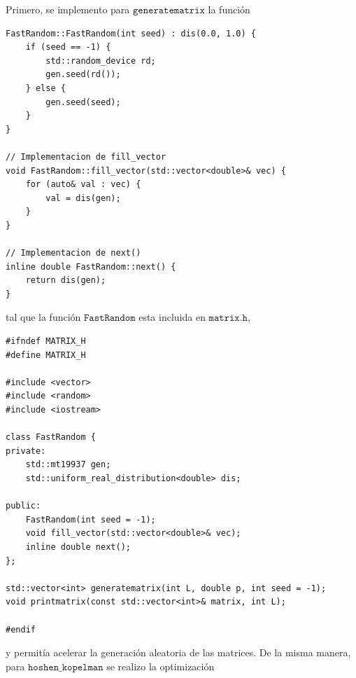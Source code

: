 \documentclass[12pt,a4paper]{article}
\begin{document}
Primero, se implemento para $\texttt{generatematrix}$ la función 
\\

\begin{lstlisting}[style=cpp-style]
FastRandom::FastRandom(int seed) : dis(0.0, 1.0) {
    if (seed == -1) {
        std::random_device rd;
        gen.seed(rd());
    } else {
        gen.seed(seed);
    }
}

// Implementacion de fill_vector
void FastRandom::fill_vector(std::vector<double>& vec) {
    for (auto& val : vec) {
        val = dis(gen);
    }
}

// Implementacion de next()
inline double FastRandom::next() {
    return dis(gen);
}
\end{lstlisting}


tal que la función $\texttt{FastRandom}$ esta incluida en 
$\texttt{matrix.h}$,
\\

\begin{lstlisting}[style=cpp-style]
#ifndef MATRIX_H
#define MATRIX_H

#include <vector>
#include <random>
#include <iostream>

class FastRandom {
private:
    std::mt19937 gen;
    std::uniform_real_distribution<double> dis;
    
public:
    FastRandom(int seed = -1);
    void fill_vector(std::vector<double>& vec);
    inline double next();
};

std::vector<int> generatematrix(int L, double p, int seed = -1);
void printmatrix(const std::vector<int>& matrix, int L);

#endif 
\end{lstlisting}

y permitía acelerar la generación aleatoria de las matrices. De la misma manera, para $\texttt{hoshen\_kopelman}$ se realizo la optimización
\\
\end{document}
